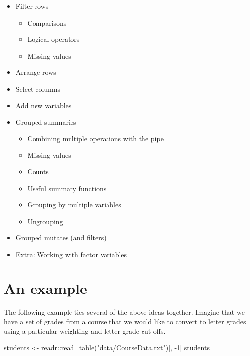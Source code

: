 \documentclass[
]{book}
\newenvironment{Shaded}{\begin{snugshade}}{\end{snugshade}}
\newcommand{\DecValTok}[1]{\textcolor[rgb]{0.00,0.00,0.81}{#1}}
\newcommand{\FunctionTok}[1]{\textcolor[rgb]{0.00,0.00,0.00}{#1}}
\newcommand{\NormalTok}[1]{#1}
\newcommand{\OtherTok}[1]{\textcolor[rgb]{0.56,0.35,0.01}{#1}}
\newcommand{\SpecialCharTok}[1]{\textcolor[rgb]{0.00,0.00,0.00}{#1}}
\newcommand{\StringTok}[1]{\textcolor[rgb]{0.31,0.60,0.02}{#1}}
\providecommand{\tightlist}{%
  \setlength{\itemsep}{0pt}\setlength{\parskip}{0pt}}
\begin{document}
\begin{itemize}
\tightlist
\item
  Filter rows

  \begin{itemize}
  \tightlist
  \item
    Comparisons
  \item
    Logical operators
  \item
    Missing values
  \end{itemize}
\item
  Arrange rows
\item
  Select columns
\item
  Add new variables
\item
  Grouped summaries

  \begin{itemize}
  \tightlist
  \item
    Combining multiple operations with the pipe
  \item
    Missing values
  \item
    Counts
  \item
    Useful summary functions
  \item
    Grouping by multiple variables
  \item
    Ungrouping
  \end{itemize}
\item
  Grouped mutates (and filters)
\item
  Extra: Working with factor variables
\end{itemize}

\hypertarget{an-example-1}{%
\section{An example}\label{an-example-1}}

The following example ties several of the above ideas together. Imagine that we have a set of grades from a course that we would like to convert to letter grades using a particular weighting and letter-grade cut-offs.

\begin{Shaded}
\begin{Highlighting}[]
\NormalTok{students }\OtherTok{\textless{}{-}}\NormalTok{ readr}\SpecialCharTok{::}\FunctionTok{read\_table}\NormalTok{(}\StringTok{"data/CourseData.txt"}\NormalTok{)[, }\SpecialCharTok{{-}}\DecValTok{1}\NormalTok{]}
\NormalTok{students}
\end{Highlighting}
\end{Shaded}
\end{document}
